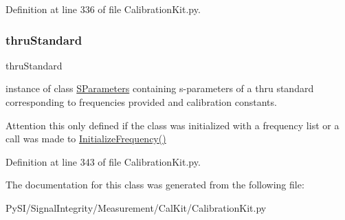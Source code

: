 Definition at line 336 of file Calibration\+Kit.\+py.

\mbox{\label{classSignalIntegrity_1_1Measurement_1_1CalKit_1_1CalibrationKit_1_1CalibrationKit_a63691e31dc0a91dbcfe40635f9c87599}} 
\subsubsection{\texorpdfstring{thru\+Standard}{thruStandard}}
{\footnotesize\ttfamily thru\+Standard}



instance of class \hyperlink{namespaceSignalIntegrity_1_1SParameters}{S\+Parameters} containing s-\/parameters of a thru standard corresponding to frequencies provided and calibration constants. 

\begin{DoxyAttention}{Attention}
this only defined if the class was initialized with a frequency list or a call was made to \hyperlink{classSignalIntegrity_1_1Measurement_1_1CalKit_1_1CalibrationKit_1_1CalibrationKit_a068ffbf43377a9e28cccb8b6013772ea}{Initialize\+Frequency()} 
\end{DoxyAttention}


Definition at line 343 of file Calibration\+Kit.\+py.



The documentation for this class was generated from the following file\+:\begin{DoxyCompactItemize}
\item 
Py\+S\+I/\+Signal\+Integrity/\+Measurement/\+Cal\+Kit/Calibration\+Kit.\+py\end{DoxyCompactItemize}
